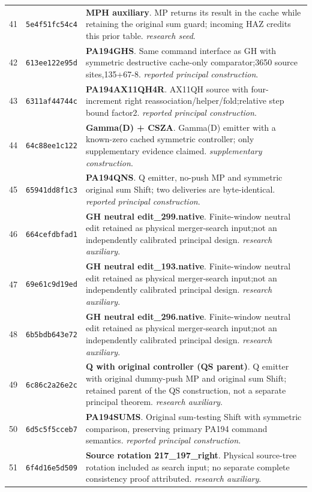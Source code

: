 \begin{longtable}{@{}r p{} p{}@{}}
41 & \texttt{5e4f51fc54c4} & \textbf{MPH auxiliary}. MP returns its result in the cache while retaining the original sum guard; incoming HAZ credits this prior table. \emph{research seed}.\\[3pt]
42 & \texttt{613ee122e95d} & \textbf{PA194GHS}. Same command interface as GH with symmetric destructive cache-only comparator;3650 source sites,135+67-8. \emph{reported principal construction}.\\[3pt]
43 & \texttt{6311af44744c} & \textbf{PA194AX11QH4R}. AX11QH source with four-increment right reassociation/helper/fold;relative step bound factor2. \emph{reported principal construction}.\\[3pt]
44 & \texttt{64c88ee1c122} & \textbf{Gamma(D) + CSZA}. Gamma(D) emitter with a known-zero cached symmetric controller; only supplementary evidence claimed. \emph{supplementary construction}.\\[3pt]
45 & \texttt{65941dd8f1c3} & \textbf{PA194QNS}. Q emitter, no-push MP and symmetric original sum Shift; two deliveries are byte-identical. \emph{reported principal construction}.\\[3pt]
46 & \texttt{664cefdbfad1} & \textbf{GH neutral edit\_299.native}. Finite-window neutral edit retained as physical merger-search input;not an independently calibrated principal design. \emph{research auxiliary}.\\[3pt]
47 & \texttt{69e61c9d19ed} & \textbf{GH neutral edit\_193.native}. Finite-window neutral edit retained as physical merger-search input;not an independently calibrated principal design. \emph{research auxiliary}.\\[3pt]
48 & \texttt{6b5bdb643e72} & \textbf{GH neutral edit\_296.native}. Finite-window neutral edit retained as physical merger-search input;not an independently calibrated principal design. \emph{research auxiliary}.\\[3pt]
49 & \texttt{6c86c2a26e2c} & \textbf{Q with original controller (QS parent)}. Q emitter with original dummy-push MP and original sum Shift; retained parent of the QS construction, not a separate principal theorem. \emph{research auxiliary}.\\[3pt]
50 & \texttt{6d5c5f5cceb7} & \textbf{PA194SUMS}. Original sum-testing Shift with symmetric comparison, preserving primary PA194 command semantics. \emph{reported principal construction}.\\[3pt]
51 & \texttt{6f4d16e5d509} & \textbf{Source rotation 217\_197\_right}. Physical source-tree rotation included as search input; no separate complete consistency proof attributed. \emph{research auxiliary}.\\[3pt]

\end{longtable}
